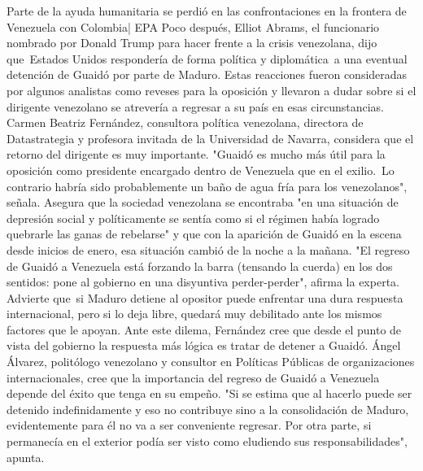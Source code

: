 \documentclass{article}%
\begin{document}
\newline%
%
Parte de la ayuda humanitaria se perdió en las confrontaciones en la frontera de Venezuela con Colombia| EPA%
\newline%
%
Poco después, Elliot Abrams, el funcionario nombrado por Donald Trump para hacer frente a la crisis venezolana, dijo que~Estados Unidos respondería de forma política y diplomática~a una eventual detención de Guaidó por parte de Maduro.%
\newline%
%
Estas reacciones fueron consideradas por algunos analistas como reveses para la oposición y llevaron a dudar sobre si el dirigente venezolano se atrevería a regresar a su país en esas circunstancias.%
\newline%
%
Carmen Beatriz Fernández, consultora política venezolana, directora de Datastrategia y profesora invitada de la Universidad de Navarra, considera que el retorno del dirigente es muy importante.%
\newline%
%
"Guaidó es mucho más útil para la oposición como presidente encargado dentro de Venezuela que en el exilio.~Lo contrario habría sido probablemente un baño de agua fría para los venezolanos", señala.%
\newline%
%
Asegura que la sociedad venezolana se encontraba "en una situación de depresión social y políticamente se sentía como si el régimen había logrado quebrarle las ganas de rebelarse" y que con la aparición de Guaidó en la escena desde inicios de enero, esa situación cambió de la noche a la mañana.%
\newline%
%
"El regreso de Guaidó a Venezuela está forzando la barra (tensando la cuerda) en los dos sentidos: pone al gobierno en una disyuntiva perder{-}perder", afirma la experta.%
\newline%
%
Advierte que~si Maduro detiene al opositor puede enfrentar una dura respuesta internacional, pero si lo deja libre, quedará muy debilitado ante los mismos factores que le apoyan.%
\newline%
%
Ante este dilema, Fernández cree que desde el punto de vista del gobierno la respuesta más lógica es tratar de detener a Guaidó.%
\newline%
%
Ángel Álvarez, politólogo venezolano y consultor en Políticas Públicas de organizaciones internacionales, cree que la importancia del regreso de Guaidó a Venezuela depende del éxito que tenga en su empeño.%
\newline%
%
"Si se estima que al hacerlo puede ser detenido indefinidamente y eso no contribuye sino a la consolidación de Maduro, evidentemente para él no va a ser conveniente regresar. Por otra parte, si permanecía en el exterior podía ser visto como eludiendo sus responsabilidades", apunta.%
\end{document}
